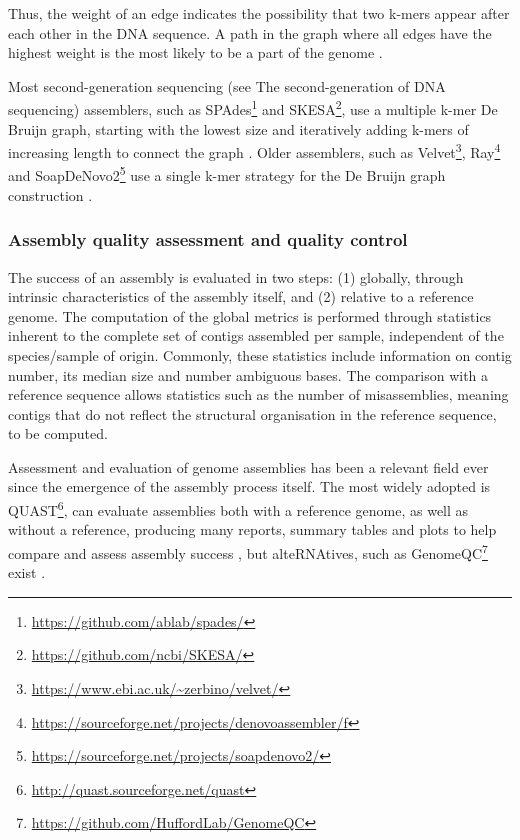Thus, the weight of an edge indicates the possibility that two k-mers appear after each other in the \ac{DNA} sequence. A path in the graph where all edges have the highest weight is the most likely to be a part of the genome \citep{bayat_methods_2020}.

Most second-generation sequencing (see  The second-generation of \ac{DNA} sequencing) assemblers, such as SPAdes\footnote{\url{https://github.com/ablab/spades/}} and  SKESA\footnote{\url{https://github.com/ncbi/SKESA/}}, use a multiple k-mer De Bruijn graph, starting with the lowest size and iteratively adding k-mers of increasing length to connect the graph \citep{bankevich_spades_2012, souvorov_skesa_2018, li_megahit_2015}. Older assemblers, such as Velvet\footnote{\url{https://www.ebi.ac.uk/~zerbino/velvet/}}, Ray\footnote{\url{https://sourceforge.net/projects/denovoassembler/f}} and SoapDeNovo2\footnote{\url{https://sourceforge.net/projects/soapdenovo2/}} use a single k-mer strategy for the De Bruijn graph construction \citep{zerbino_velvet_2008, boisvert_ray_2010, luo_soapdenovo2_2012}. 

\subsubsection{Assembly quality assessment and quality control} \label{ssec:_intro_assembly_quality}

The success of an assembly is evaluated in two steps: (1) globally, through intrinsic characteristics of the assembly itself, and (2) relative to a reference genome. The computation of the global metrics is performed through statistics inherent to the complete set of contigs assembled per sample, independent of the species/sample of origin. Commonly, these statistics include information on contig number, its median size and number ambiguous bases. The comparison with a reference sequence allows statistics such as the number of misassemblies, meaning contigs that do not reflect the structural organisation in the reference sequence, to be computed. 

Assessment and evaluation of genome assemblies has been a relevant field ever since the emergence of the assembly process itself. 
The most widely adopted is QUAST\footnote{\url{http://quast.sourceforge.net/quast}}, can evaluate assemblies both with a reference genome, as well as without a reference, producing many reports, summary tables and plots to help compare and assess assembly success \citep{gurevich_quast_2013}, but alte\ac{RNA}tives, such as GenomeQC\footnote{\url{https://github.com/HuffordLab/GenomeQC}} exist \citep{manchanda_genomeqc_2020}. 

